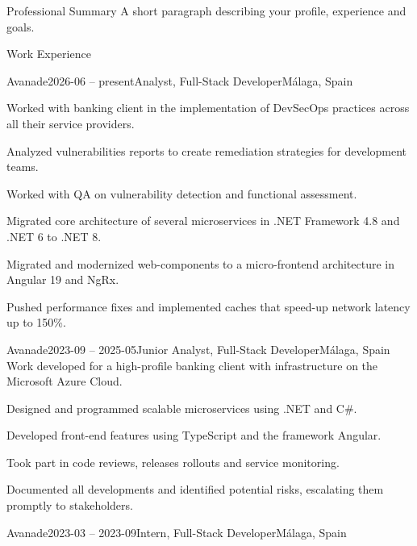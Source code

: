 \documentclass{resume} %
\subtitle{Software Engineer}
\begin{document}
\printname
\printcontact


\begin{rSection}{Professional Summary}
A short paragraph describing your profile, experience and goals.
\end{rSection}


\begin{rSection}{Work Experience}

\begin{rSubsection}{Avanade}{2026-06 -- present}{Analyst, Full-Stack Developer}{Málaga, Spain}
	\item Worked with banking client in the implementation of DevSecOps practices across all their service providers.
	\item Analyzed vulnerabilities reports to create remediation strategies for development teams.
	\item Worked with QA on vulnerability detection and functional assessment.
	\item Migrated core architecture of several microservices in .NET Framework 4.8 and .NET 6 to .NET 8.
	\item Migrated and modernized web-components to a micro-frontend architecture in Angular 19 and NgRx.
	\item Pushed performance fixes and implemented caches that speed-up network latency up to 150\%.
\end{rSubsection}

\begin{rSubsection}{Avanade}{2023-09 -- 2025-05}{Junior Analyst, Full-Stack Developer}{Málaga, Spain}
	Work developed for a high-profile banking client with infrastructure on the Microsoft Azure Cloud.
	\item Designed and programmed scalable microservices using .NET and C\#.
	\item Developed front-end features using TypeScript and the framework Angular.
	\item Took part in code reviews, releases rollouts and service monitoring.
	\item Documented all developments and identified potential risks, escalating them promptly to stakeholders.
	
\end{rSubsection}

\begin{rSubsection}{Avanade}{2023-03 -- 2023-09}{Intern, Full-Stack Developer}{Málaga, Spain}
\end{rSubsection}
\end{rSection}
\end{document}
